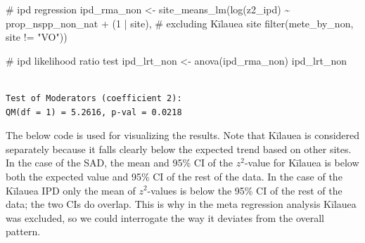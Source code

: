 \documentclass[
  letterpaper,
  DIV=11,
  numbers=noendperiod]{scrartcl}
\newenvironment{Shaded}{\begin{snugshade}}{\end{snugshade}}
\newcommand{\CommentTok}[1]{\textcolor[rgb]{0.37,0.37,0.37}{#1}}
\newcommand{\DecValTok}[1]{\textcolor[rgb]{0.68,0.00,0.00}{#1}}
\newcommand{\FunctionTok}[1]{\textcolor[rgb]{0.28,0.35,0.67}{#1}}
\newcommand{\NormalTok}[1]{\textcolor[rgb]{0.00,0.23,0.31}{#1}}
\newcommand{\OtherTok}[1]{\textcolor[rgb]{0.00,0.23,0.31}{#1}}
\newcommand{\SpecialCharTok}[1]{\textcolor[rgb]{0.37,0.37,0.37}{#1}}
\newcommand{\StringTok}[1]{\textcolor[rgb]{0.13,0.47,0.30}{#1}}
\begin{document}
\begin{Shaded}
\begin{Highlighting}[]
\CommentTok{\# ipd regression }
\NormalTok{ipd\_rma\_non }\OtherTok{\textless{}{-}} \FunctionTok{site\_means\_lm}\NormalTok{(}\FunctionTok{log}\NormalTok{(z2\_ipd) }\SpecialCharTok{\textasciitilde{}}\NormalTok{ prop\_nspp\_non\_nat }\SpecialCharTok{+}\NormalTok{ (}\DecValTok{1} \SpecialCharTok{|}\NormalTok{ site), }
                             \CommentTok{\# excluding Kīlauea site}
                             \FunctionTok{filter}\NormalTok{(mete\_by\_non, site }\SpecialCharTok{!=} \StringTok{"VO"}\NormalTok{))}

\CommentTok{\# ipd likelihood ratio test}
\NormalTok{ipd\_lrt\_non }\OtherTok{\textless{}{-}} \FunctionTok{anova}\NormalTok{(ipd\_rma\_non)}
\NormalTok{ipd\_lrt\_non}
\end{Highlighting}
\end{Shaded}

\begin{verbatim}

Test of Moderators (coefficient 2):
QM(df = 1) = 5.2616, p-val = 0.0218
\end{verbatim}

The below code is used for visualizing the results. Note that Kīlauea is
considered separately because it falls clearly below the expected trend
based on other sites. In the case of the SAD, the mean and 95\% CI of
the \(z^2\)-value for Kīlauea is below both the expected value and 95\%
CI of the rest of the data. In the case of the Kīlauea IPD only the mean
of \(z^2\)-values is below the 95\% CI of the rest of the data; the two
CIs do overlap. This is why in the meta regression analysis Kīlauea was
excluded, so we could interrogate the way it deviates from the overall
pattern.
\end{document}
